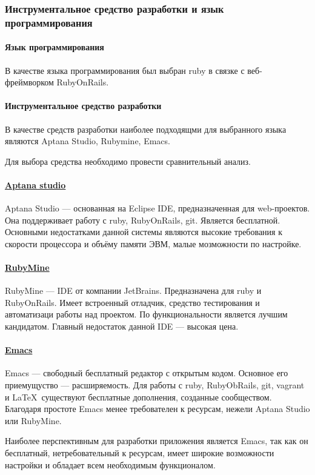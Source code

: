 \subsubsection{Инструментальное средство разработки и язык программирования}

\paragraph{Язык программирования}

В качестве языка программирования был выбран ruby в связке с веб-фреймворком RubyOnRails.

\paragraph{Инструментальное средство разработки}

В качестве средств разработки наиболее подходящми для выбранного языка являются Aptana Studio, Rubymine, Emacs.

Для выбора средства необходимо провести сравнительный анализ.

\paragraph{\href{http://aptana.com/}{Aptana studio}}

Aptana Studio --- основанная на Eclipse IDE, предназначенная для web-проектов. Она поддерживает работу с ruby, RubyOnRails, git. Является бесплатной. Основными недостатками данной системы являются высокие требования к скорости процессора и объёму памяти ЭВМ, малые мозможности по настройке.

\paragraph{\href{http://www.jetbrains.com/ruby/}{RubyMine}}

RubyMine --- IDE от компании JetBrains. Предназначена для ruby и RubyOnRails. Имеет встроенный отладчик, средство тестирования и автоматизаци работы над проектом. По функциональности является лучшим кандидатом. Главный недостаток данной IDE --- высокая цена.

\paragraph{\href{http://www.gnu.org/software/emacs/}{Emacs}}

Emacs --- свободный бесплатный редактор с открытым кодом. Основное его приемущуство --- расширяемость. Для работы с ruby, RubyObRails, git, vagrant и \LaTeX~существуют бесплатные дополнения, созданные сообществом. Благодаря простоте Emacs менее требователен к ресурсам, нежели Aptana Studio или RubyMine.

Наиболее перспективным для разработки приложения является Emacs, так как он бесплатный, нетребовательный к ресурсам, имеет широкие возможности настройки и обладает всем необходимым функционалом.
